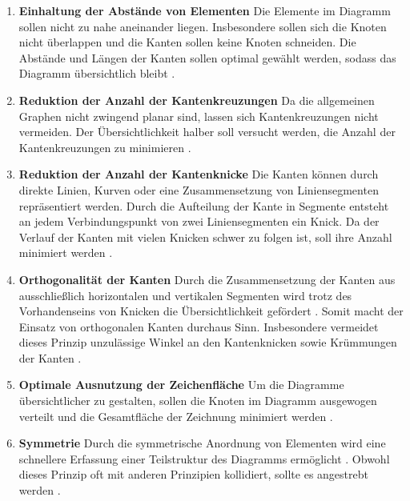 \newcommand{\aestheticscriterialabel}{ÄP}
\begin{enumerate}[label={\aestheticscriterialabel.\arabic*}]

\item
\label{pri:distances}
\textbf{Einhaltung der Abstände von Elementen}
Die Elemente im Diagramm sollen nicht zu nahe aneinander liegen. Insbesondere sollen sich die Knoten nicht überlappen und die Kanten sollen keine Knoten schneiden. Die Abstände und Längen der Kanten sollen optimal gewählt werden, sodass das Diagramm übersichtlich bleibt \cite{Siebenhaller03Automatisches, Ambler05The-Elements}.

\item
\label{pri:edge-crossings}
\textbf{Reduktion der Anzahl der Kantenkreuzungen}
Da die allgemeinen Graphen nicht zwingend planar sind, lassen sich Kantenkreuzungen nicht vermeiden. Der Übersichtlichkeit halber soll versucht werden, die Anzahl der Kantenkreuzungen zu minimieren \cite{Siebenhaller03Automatisches, EichelbergerSchmid09Guidelines}.

\item
\label{pri:edge-bends}
\textbf{Reduktion der Anzahl der Kantenknicke}
Die Kanten können durch direkte Linien, Kurven oder eine Zusammensetzung von Liniensegmenten repräsentiert werden. Durch die Aufteilung der Kante in Segmente entsteht an jedem Verbindungspunkt von zwei Liniensegmenten ein Knick. Da der Verlauf der Kanten mit vielen Knicken schwer zu folgen ist, soll ihre Anzahl minimiert werden \cite{Siebenhaller03Automatisches}.

\item
\label{pri:orthogonality}
\textbf{Orthogonalität der Kanten}
Durch die Zusammensetzung der Kanten aus ausschließlich horizontalen und vertikalen Segmenten wird trotz des Vorhandenseins von Knicken die Übersichtlichkeit gefördert \cite{Siebenhaller03Automatisches}. Somit macht der Einsatz von orthogonalen Kanten durchaus Sinn. Insbesondere vermeidet dieses Prinzip unzulässige Winkel an den Kantenknicken \cite{Siebenhaller03Automatisches} sowie Krümmungen der Kanten \cite{Ambler05The-Elements}.

\item
\label{pri:drawing-area}
\textbf{Optimale Ausnutzung der Zeichenfläche}
Um die Diagramme übersichtlicher zu gestalten, sollen die Knoten im Diagramm ausgewogen verteilt und die Gesamtfläche der Zeichnung minimiert werden \cite{EichelbergerSchmid09Guidelines, Siebenhaller03Automatisches}.

\item
\label{pri:symmetry}
\textbf{Symmetrie}
Durch die symmetrische Anordnung von Elementen wird eine schnellere Erfassung einer Teilstruktur des Diagramms ermöglicht \cite{Eichelberger05Aesthetics, Ambler05The-Elements}. Obwohl dieses Prinzip oft mit anderen Prinzipien kollidiert, sollte es angestrebt werden \cite{Siebenhaller03Automatisches}.

\end{enumerate}


